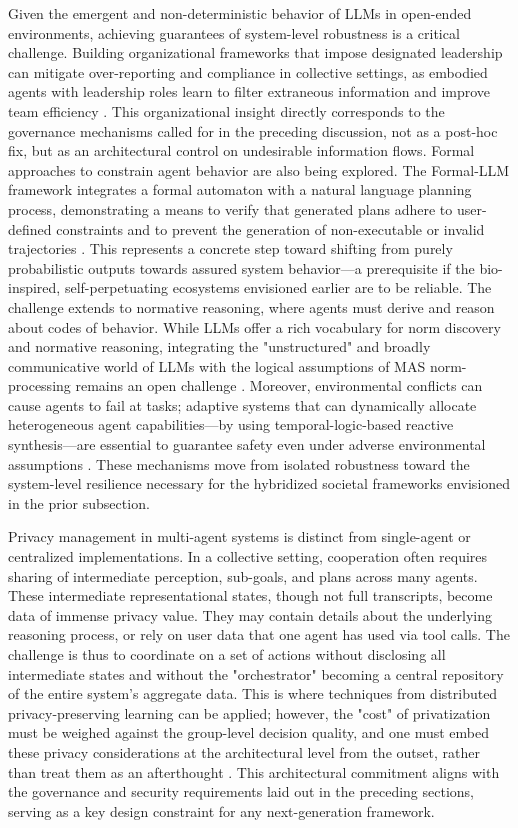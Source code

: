 \documentclass[11pt,a4paper]{article}
\begin{document}
Given the emergent and non-deterministic behavior of LLMs in open-ended environments, achieving guarantees of system-level robustness is a critical challenge. Building organizational frameworks that impose designated leadership can mitigate over-reporting and compliance in collective settings, as embodied agents with leadership roles learn to filter extraneous information and improve team efficiency \cite{arxiv:2403.12482v1}. This organizational insight directly corresponds to the governance mechanisms called for in the preceding discussion, not as a post-hoc fix, but as an architectural control on undesirable information flows. Formal approaches to constrain agent behavior are also being explored. The Formal-LLM framework integrates a formal automaton with a natural language planning process, demonstrating a means to verify that generated plans adhere to user-defined constraints and to prevent the generation of non-executable or invalid trajectories \cite{arxiv:2402.00798v2}. This represents a concrete step toward shifting from purely probabilistic outputs towards assured system behavior---a prerequisite if the bio-inspired, self-perpetuating ecosystems envisioned earlier are to be reliable. The challenge extends to normative reasoning, where agents must derive and reason about codes of behavior. While LLMs offer a rich vocabulary for norm discovery and normative reasoning, integrating the "unstructured" and broadly communicative world of LLMs with the logical assumptions of MAS norm-processing remains an open challenge \cite{arxiv:2403.16524v1}. Moreover, environmental conflicts can cause agents to fail at tasks; adaptive systems that can dynamically allocate heterogeneous agent capabilities---by using temporal-logic-based reactive synthesis---are essential to guarantee safety even under adverse environmental assumptions \cite{arxiv:2206.01833v3}. These mechanisms move from isolated robustness toward the system-level resilience necessary for the hybridized societal frameworks envisioned in the prior subsection.

Privacy management in multi-agent systems is distinct from single-agent or centralized implementations. In a collective setting, cooperation often requires sharing of intermediate perception, sub-goals, and plans across many agents. These intermediate representational states, though not full transcripts, become data of immense privacy value. They may contain details about the underlying reasoning process, or rely on user data that one agent has used via tool calls. The challenge is thus to coordinate on a set of actions without disclosing all intermediate states and without the "orchestrator" becoming a central repository of the entire system's aggregate data. This is where techniques from distributed privacy-preserving learning can be applied; however, the "cost" of privatization must be weighed against the group-level decision quality, and one must embed these privacy considerations at the architectural level from the outset, rather than treat them as an afterthought \cite{arxiv:2203.08975v1}. This architectural commitment aligns with the governance and security requirements laid out in the preceding sections, serving as a key design constraint for any next-generation framework.
\end{document}

